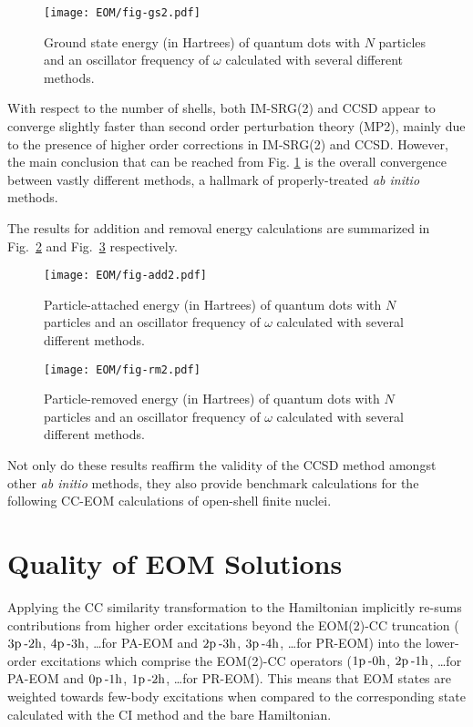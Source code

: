 \documentclass[thesis.tex]{subfiles}
\begin{document}
\begin{figure}[h]
  \texttt{[image: EOM/fig-gs2.pdf]}
  \caption{Ground state energy (in Hartrees) of quantum dots with $N$ particles and an oscillator frequency of $\omega$ calculated with several different methods.}
  \label{fig:QDground}
\end{figure}

With respect to the number of shells, both IM-SRG(2) and CCSD appear to converge slightly faster than second order perturbation theory (MP2), mainly due to the presence of higher order corrections in IM-SRG(2) and CCSD.  However, the main conclusion that can be reached from Fig. \ref{fig:QDground} is the overall convergence between vastly different methods, a hallmark of properly-treated \emph{ab initio} methods.

The results for addition and removal energy calculations are summarized in Fig.\ \ref{fig:QDadd} and Fig.\ \ref{fig:QDrm} respectively.
\begin{figure}
  \centering
  \texttt{[image: EOM/fig-add2.pdf]}
  \caption{Particle-attached energy (in Hartrees) of quantum dots with $N$ particles and an oscillator frequency of $\omega$ calculated with several different methods.}
  \label{fig:QDadd}
\end{figure}

\begin{figure}
  \centering
  \texttt{[image: EOM/fig-rm2.pdf]}
  \caption{Particle-removed energy (in Hartrees) of quantum dots with $N$ particles and an oscillator frequency of $\omega$ calculated with several different methods.}
  \label{fig:QDrm}
\end{figure}

Not only do these results reaffirm the validity of the CCSD method amongst other \emph{ab initio} methods, they also provide benchmark calculations for the following CC-EOM calculations of open-shell finite nuclei.

\section{Quality of EOM Solutions} \label{section:eom_quality}

Applying the CC similarity transformation to the Hamiltonian implicitly re-sums contributions from higher order excitations beyond the EOM(2)-CC truncation ($3\mathrm{p}\hspace{2pt}\text{-}2\mathrm{h}$, $4\mathrm{p}\hspace{2pt}\text{-}3\mathrm{h}$, \ldots for PA-EOM and $2\mathrm{p}\hspace{2pt}\text{-}3\mathrm{h}$, $3\mathrm{p}\hspace{2pt}\text{-}4\mathrm{h}$, \ldots for PR-EOM) into the lower-order excitations which comprise the EOM(2)-CC operators ($1\mathrm{p}\hspace{2pt}\text{-}0\mathrm{h}$, $2\mathrm{p}\hspace{2pt}\text{-}1\mathrm{h}$, \ldots for PA-EOM and $0\mathrm{p}\hspace{2pt}\text{-}1\mathrm{h}$, $1\mathrm{p}\hspace{2pt}\text{-}2\mathrm{h}$, \ldots for PR-EOM).  This means that EOM states are weighted towards few-body excitations when compared to the corresponding state calculated with the CI method and the bare Hamiltonian.
\end{document}
